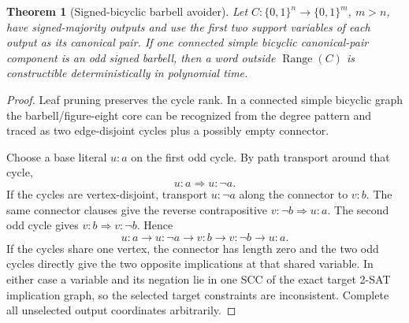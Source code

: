 \documentclass[11pt]{article}
\newtheorem{theorem}{Theorem}
\begin{document}
\begin{theorem}[Signed-bicyclic barbell avoider]
Let $C:\{0,1\}^n\to\{0,1\}^m$, $m>n$, have signed-majority outputs and use the
first two support variables of each output as its canonical pair.  If one
connected simple bicyclic canonical-pair component is an odd signed barbell,
then a word outside $\operatorname{Range}(C)$ is constructible deterministically
in polynomial time.
\end{theorem}
\begin{proof}
Leaf pruning preserves the cycle rank.  In a connected simple bicyclic graph the
barbell/figure-eight core can be recognized from the degree pattern and traced
as two edge-disjoint cycles plus a possibly empty connector.

Choose a base literal $u:a$ on the first odd cycle.  By path transport around
that cycle,
\[
 u:a\Longrightarrow u:\neg a.
\]
If the cycles are vertex-disjoint, transport $u:\neg a$ along the connector to
$v:b$.  The same connector clauses give the reverse contrapositive
$v:\neg b\Rightarrow u:a$.  The second odd cycle gives
$v:b\Rightarrow v:\neg b$.  Hence
\[
 u:a\to u:\neg a\to v:b\to v:\neg b\to u:a.
\]
If the cycles share one vertex, the connector has length zero and the two odd
cycles directly give the two opposite implications at that shared variable.
In either case a variable and its negation lie in one SCC of the exact target
2-SAT implication graph, so the selected target constraints are inconsistent.
Complete all unselected output coordinates arbitrarily.
\end{proof}
\end{document}
